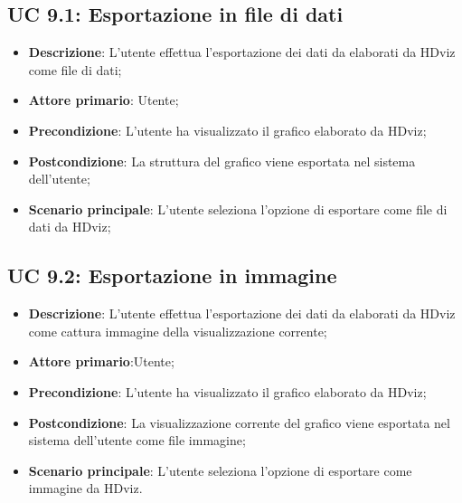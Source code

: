 \subsection{UC 9.1: Esportazione in file di dati}
\begin{itemize}
    \item{\textbf{Descrizione}}: L'utente effettua l'esportazione dei dati da elaborati da HDviz come file di dati;
    \item{\textbf{Attore primario}}: Utente;
    \item{\textbf{Precondizione}}: L'utente ha visualizzato il grafico elaborato da HDviz;
    \item{\textbf{Postcondizione}}: La struttura del grafico viene esportata nel sistema dell'utente;
    \item{\textbf{Scenario principale}}: L'utente seleziona l'opzione di esportare come file di dati da HDviz;
\end{itemize}

\subsection{UC 9.2: Esportazione in immagine}
\begin{itemize}
    \item{\textbf{Descrizione}}:    L'utente effettua l'esportazione dei dati da elaborati da HDviz come 
                                    cattura immagine della visualizzazione corrente;
    \item{\textbf{Attore primario}}:Utente;
    \item{\textbf{Precondizione}}:  L'utente ha visualizzato il grafico elaborato da HDviz;
    \item{\textbf{Postcondizione}}: La visualizzazione corrente del grafico viene esportata nel sistema 
                                    dell'utente come file immagine;
    \item{\textbf{Scenario principale}}: L'utente seleziona l'opzione di esportare come immagine da HDviz.
\end{itemize}
